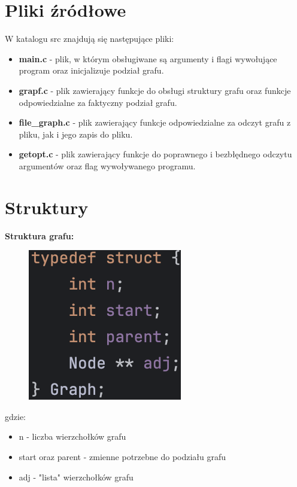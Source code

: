 \documentclass{article}
\begin{document}
\section*{Pliki źródłowe}
W katalogu src znajdują się następujące pliki:
\begin{itemize}
    \item \textbf{main.c} - plik, w którym obsługiwane są argumenty i flagi wywołujące program oraz inicjalizuje podział grafu.

    \item \textbf{grapf.c} - plik zawierający funkcje do obsługi struktury grafu oraz funkcje odpowiedzialne za faktyczny podział grafu.

    \item \textbf{file\_graph.c} - plik zawierający funkcje odpowiedzialne za odczyt grafu z pliku, jak i jego zapis do pliku.

    \item \textbf{getopt.c} - plik zawierający funkcje do poprawnego i bezbłędnego odczytu argumentów oraz flag wywoływanego programu.
    
\end{itemize}

\section*{Struktury}
\textbf{Struktura grafu:}\\

\begin{figure}[ht]
  \includegraphics[]{img/graph.png}
\end{figure}
gdzie:
\begin{itemize}
    \item n - liczba wierzchołków grafu
    \item start oraz parent - zmienne potrzebne do podziału grafu
    \item adj - "lista" wierzchołków grafu
\end{itemize}
\end{document}
